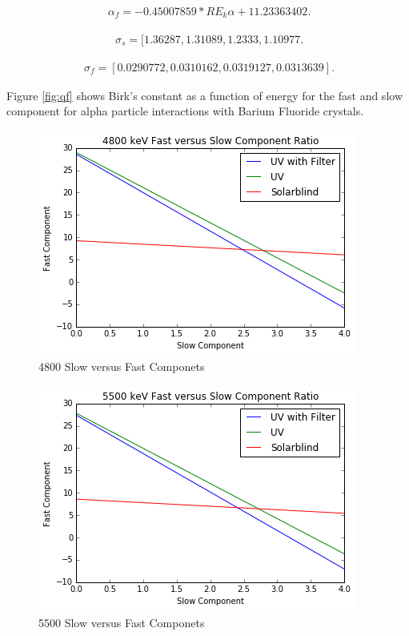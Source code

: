 \documentclass[aip, jmp, amssymb, amsmath, reprint, floatfix]{revtex4-1}
\begin{document}
\begin{eqnarray}
\ \alpha_f = -0.45007859 * RE_k\alpha + 11.23363402
\label{eq:eleven}.
\end{eqnarray}

\begin{eqnarray}
\ \sigma_s = [1.36287, 1.31089, 1.2333, 1.10977
\label{eq:twelve}.
\end{eqnarray}

\begin{eqnarray}
\ \sigma_f = [0.0290772, 0.0310162, 0.0319127, 0.0313639]
\label{eq:thirteen}.
\end{eqnarray}


\noindent
Figure \ref{fig:qf} shows Birk's constant as a function of energy for the fast and slow component for alpha particle interactions with Barium Fluoride crystals.

\begin{figure}
  \centering
    \includegraphics[width=.8\columnwidth]{first.png}
  \caption{4800 Slow versus Fast Componets}
  \label{fig:third}
\end{figure} 

\begin{figure}
  \centering
    \includegraphics[width=.8\columnwidth]{second.png}
  \caption{5500 Slow versus Fast Componets}
  \label{fig:second}
\end{figure} 
\end{document}
